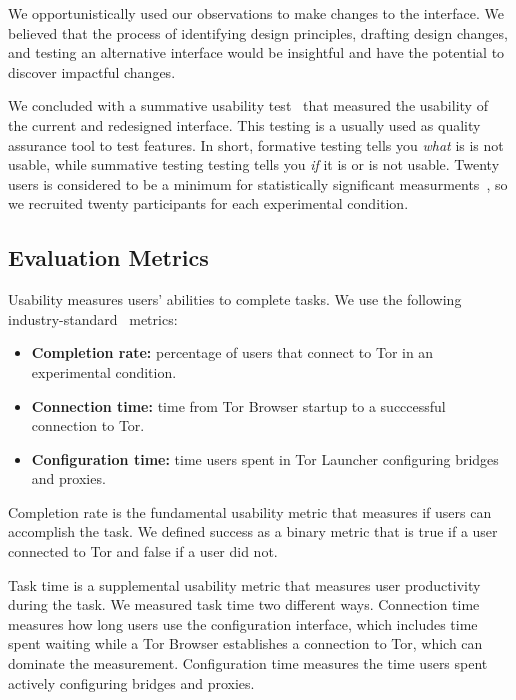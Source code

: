 \documentclass[USenglish,oneside,twocolumn]{article}
\begin{document}
We opportunistically used our observations to make changes to the interface. We believed that the process of identifying design principles, drafting design changes, and testing an alternative interface would be insightful and have the potential to discover impactful changes.

We concluded with a summative usability test~\cite{summative} that measured the usability of the current and redesigned interface. This testing is a usually used as quality assurance tool to test features. In short, formative testing tells you {\it what} is is not usable, while summative testing testing tells you {\it if} it is or is not usable. Twenty users is considered to be a minimum for statistically significant measurments~\cite{howmanyusers}, so we recruited twenty participants for each experimental condition.  

\subsection{Evaluation Metrics}
\label{sec:eval}
Usability measures users' abilities to complete tasks. We use the following industry-standard~\cite{albert2013measuring} metrics: \\

\begin{itemize}
\item {\bfseries Completion rate:}  percentage of users that connect to Tor in an experimental condition. 
\item {\bfseries Connection time:} time from Tor Browser startup to a succcessful connection to Tor. 
\item {\bfseries Configuration time:} time users spent in Tor Launcher configuring bridges and proxies.
\end{itemize}

Completion rate is the fundamental usability metric that measures if users can accomplish the task. We defined success as a binary metric that is true if a user connected to Tor and false if a user did not. 

Task time is a supplemental usability metric that measures user productivity during the task. We measured task time two different ways. Connection time measures how long users use the configuration interface, which includes time  spent waiting while a Tor Browser establishes a connection to Tor, which can dominate the measurement. Configuration time measures the time users spent actively configuring bridges and proxies. 
\end{document}
